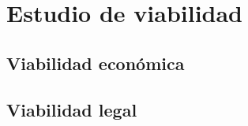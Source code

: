 \section{Estudio de viabilidad}

\subsection{Viabilidad económica}

\subsection{Viabilidad legal}



